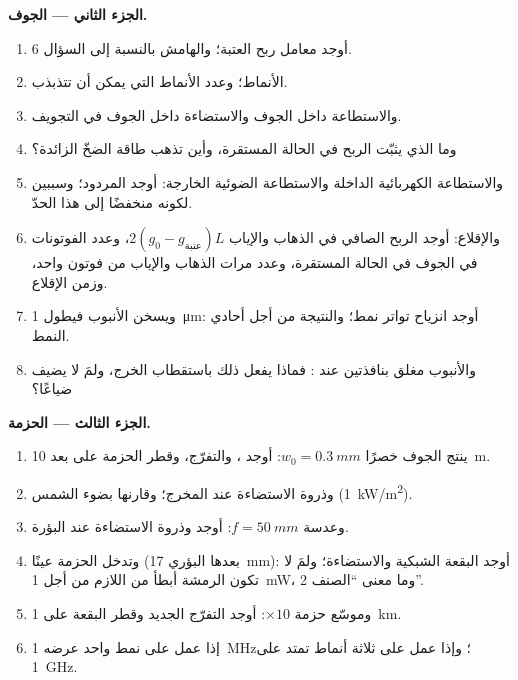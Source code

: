 \begin{problem}
\textbf{الجزء الثاني --- الجوف.}
\begin{enumerate}[resume]
  \item أوجد معامل ربح العتبة؛ والهامش بالنسبة إلى السؤال 6.
  \item {} الأنماط؛ وعدد الأنماط التي يمكن أن تتذبذب.
  \item والاستطاعة داخل الجوف والاستضاءة داخل الجوف في التجويف.
  \item وما الذي يثبّت الربح في الحالة المستقرة، وأين تذهب طاقة
        الضخّ الزائدة؟
  \item والاستطاعة الكهربائية الداخلة والاستطاعة الضوئية الخارجة: أوجد المردود؛
        وسببين لكونه منخفضًا إلى هذا الحدّ.
  \item والإقلاع: أوجد الربح الصافي في الذهاب والإياب $2(g_0 - g_{\text{عتبة}})L$،
        وعدد الفوتونات في الجوف في الحالة المستقرة، وعدد
        مرات الذهاب والإياب من فوتون واحد، وزمن الإقلاع.
  \item ويسخن الأنبوب فيطول \qty{1}{\micro m}: أوجد انزياح
        تواتر نمط؛ والنتيجة من أجل  أحادي النمط.
  \item والأنبوب مغلق بنافذتين عند : فماذا يفعل
        ذلك باستقطاب الخرج، ولمَ لا يضيف
        ضياعًا؟
\end{enumerate}

\textbf{الجزء الثالث --- الحزمة.}
\begin{enumerate}[resume]
  \item ينتج الجوف خصرًا $w_0 = \qty{0.3}{mm}$: أوجد ، والتفرّج، وقطر الحزمة على بعد \qty{10}{m}.
  \item وذروة الاستضاءة عند المخرج؛ وقارنها بضوء الشمس
        (\qty{1}{kW/m^2}).
  \item وعدسة $f = \qty{50}{mm}$: أوجد  وذروة الاستضاءة عند
        البؤرة.
  \item وتدخل الحزمة عينًا (بعدها البؤري \qty{17}{mm}): أوجد البقعة الشبكية
        والاستضاءة؛ ولمَ لا تكون الرمشة أبطأ من اللازم من أجل \qty{1}{mW}،
        وما معنى ``الصنف 2''.
  \item وموسّع حزمة $\times 10$: أوجد التفرّج الجديد وقطر البقعة
        على \qty{1}{km}.
  \item {} إذا عمل  على نمط واحد عرضه
        \qty{1}{MHz}؛ وإذا عمل على ثلاثة أنماط تمتد على \qty{1}{GHz}.
\end{enumerate}


\end{problem}
